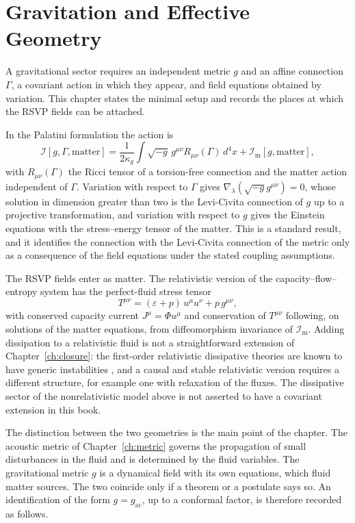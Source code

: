 \documentclass[11pt,oneside]{book}
\theoremstyle{definition}
\theoremstyle{remark}
\begin{document}
\chapter{Gravitation and Effective Geometry}\label{ch:gravity}

A gravitational sector requires an independent metric $g$ and an affine connection $\Gamma$, a covariant action in which they appear, and field equations obtained by variation. This chapter states the minimal setup and records the places at which the RSVP fields can be attached.

In the Palatini formulation the action is
\[
\mathcal I[g,\Gamma,\text{matter}]=\frac1{2\kappa_g}\int\sqrt{-g}\,g^{\mu\nu}R_{\mu\nu}(\Gamma)\,d^4x+\mathcal I_{\mathrm{m}}[g,\text{matter}],
\]
with $R_{\mu\nu}(\Gamma)$ the Ricci tensor of a torsion-free connection and the matter action independent of $\Gamma$. Variation with respect to $\Gamma$ gives $\nabla_\lambda(\sqrt{-g}g^{\mu\nu})=0$, whose solution in dimension greater than two is the Levi-Civita connection of $g$ up to a projective transformation, and variation with respect to $g$ gives the Einstein equations with the stress--energy tensor of the matter. This is a standard result, and it identifies the connection with the Levi-Civita connection of the metric only as a consequence of the field equations under the stated coupling assumptions.

The RSVP fields enter as matter. The relativistic version of the capacity--flow--entropy system has the perfect-fluid stress tensor
\[
T^{\mu\nu}=(\varepsilon+p)\,u^\mu u^\nu+p\,g^{\mu\nu},
\]
with conserved capacity current $J^\mu=\Phi u^\mu$ and conservation of $T^{\mu\nu}$ following, on solutions of the matter equations, from diffeomorphism invariance of $\mathcal I_{\mathrm m}$. Adding dissipation to a relativistic fluid is not a straightforward extension of Chapter~\ref{ch:closure}: the first-order relativistic dissipative theories are known to have generic instabilities \cite{hiscock1985}, and a causal and stable relativistic version requires a different structure, for example one with relaxation of the fluxes. The dissipative sector of the nonrelativistic model above is not asserted to have a covariant extension in this book.

The distinction between the two geometries is the main point of the chapter. The acoustic metric of Chapter~\ref{ch:metric} governs the propagation of small disturbances in the fluid and is determined by the fluid variables. The gravitational metric $g$ is a dynamical field with its own equations, which fluid matter sources. The two coincide only if a theorem or a postulate says so. An identification of the form $g=g_{\mathrm{ac}}$, up to a conformal factor, is therefore recorded as follows.
\end{document}
